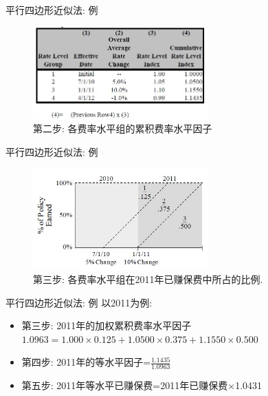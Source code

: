 \documentclass[professionalfont]{beamer}
\begin{document}
\begin{frame}{平行四边形近似法: 例}
	\begin{figure}
		\includegraphics[width=0.6\textwidth]{Plots/on_level_4.jpg}
		\caption{第二步: 各费率水平组的累积费率水平因子}
	\end{figure}
	
\end{frame}

\begin{frame}{平行四边形近似法: 例}
	\begin{figure}
		\includegraphics[width=0.6\textwidth]{Plots/on_level_3.jpg}
		\caption{第三步: 各费率水平组在2011年已赚保费中所占的比例.}
		\end{figure}

\end{frame}
\begin{frame}{平行四边形近似法: 例}
	以2011为例:
	\begin{itemize}
		\item 第三步: 2011年的加权累积费率水平因子 $1.0963=1.000\times 0.125 + 1.0500\times 0.375+ 1.1550\times0.500$ 
		\item 第四步: 2011年的等水平因子=$\frac{1.1435}{1.0963}$
		\item 第五步: 2011年等水平已赚保费=2011年已赚保费$\times$1.0431
	\end{itemize}
\end{frame}
\end{document}
